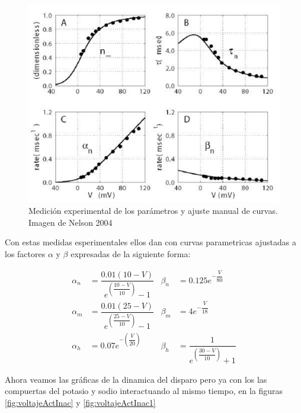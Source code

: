\begin{figure}[h]
 \centering
 \includegraphics[scale=0.5]{../Figuras/medidasExperimentales.png}
 \caption{Medición experimental de los parámetros y ajuste manual de curvas. Imagen de Nelson 2004}
 \label{fig:voltajeAB}
\end{figure}

Con estas medidas esperimentales ellos dan con curvas parametricas ajustadas a los factores \(\alpha\) y \(\beta\) expresadas de la siguiente forma:

\begin{align*}
\alpha_{n}&=\dfrac{0.01(10-V)}{e^{\left(\dfrac{10-V}{10}\right)}-1}           &  \beta_{n}&=0.125e^{-\dfrac{V}{80}}\\
\alpha_{m}&=\dfrac{0.01(25-V)}{e^{\left(\dfrac{25-V}{10}\right)}-1}                    &  \beta_{m}&=4e^{-\dfrac{V}{18}}\\
\alpha_{h}&=0.07 e^{-\left(\dfrac{V}{20}\right)}              &  \beta_{h}&=\dfrac{1}{e^{\left(\dfrac{30-V}{10}\right)}+1}
\end{align*}

Ahora veamos las gráficas de la dinamica del disparo pero ya con los las compuertas del potasio y sodio interactuando al mismo tiempo, en la figuras \ref{fig:voltajeActInac} y \ref{fig:voltajeActInac1}

